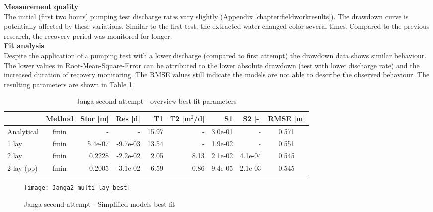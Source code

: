 \textbf{Measurement quality} \\
The initial (first two hours) pumping test discharge rates vary slightly (Appendix \ref{chapter:fieldworkresults}). The drawdown curve is potentially affected by these variations. Similar to the first test, the extracted water changed color several times. Compared to the previous research, the recovery period was monitored for longer. \\

\textbf{Fit analysis} \\
Despite the application of a pumping test with a lower discharge (compared to first attempt) the drawdown data shows similar behaviour. The lower values in Root-Mean-Square-Error can be attributed to the lower absolute drawdown (test with lower discharge rate) and the increased duration of recovery monitoring. The RMSE values still indicate the models are not able to describe the observed behaviour. The resulting parameters are shown in Table \ref{tab:Janga2_table}.

\begin{table}[h!]
\small
\centering
\caption{Janga second attempt - overview best fit parameters}
\label{tab:Janga2_table}
\begin{tabular}{l|c|r|r|rr|rr|c}
\hline 
\textbf{}       & \textbf{Method} & \textbf{Stor [m]} & \textbf{Res [d]} & \textbf{T1}  & \textbf{T2   [m$^2$/d]}  & \textbf{S1}  & \textbf{S2 [-]}  & \textbf{RMSE [m]} \\ \hline \hline
Analytical                & fmin             & -             & -            & 15.97      & -          & 3.0e-01    & -          & 0.571 \\
1 lay                     & fmin             & 5.4e-07       & -9.7e-03     & 13.54      & -          & 1.9e-02    & -          & 0.551 \\
2 lay                     & fmin             & 0.2228        & -2.2e-02     & 2.05       & 8.13       & 2.1e-02    & 4.1e-04    & 0.545 \\
2 lay (pp)                & fmin             & 0.2005        & -3.1e-02     & 6.59       & 0.86       & 9.4e-05    & 2.1e-03    & 0.545 \\ \hline    
\end{tabular}
\end{table}

\begin{figure}[h!]
 \centering
 \texttt{[image: Janga2\_multi\_lay\_best]}
 \captionsetup{justification=centering} 
 \caption{Janga second attempt - Simplified models best fit}
 \label{fig:Janga2_best}
\end{figure}

